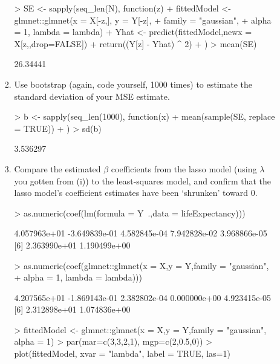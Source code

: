 \documentclass[12pt,a4paper]{paper}
\begin{document}
\begin{enumerate}
\begin{enumerate}
\begin{enumerate}
\begin{Schunk}
\begin{Sinput}
> SE <- sapply(seq_len(N), function(z){
+   fittedModel <- glmnet::glmnet(x = X[-z,], y = Y[-z], 
+                                 family = "gaussian", 
+                                 alpha = 1, lambda = lambda)
+   Yhat <- predict(fittedModel,newx = X[z,,drop=FALSE])
+   return((Y[z] - Yhat) ^ 2)
+ })
> mean(SE)
\end{Sinput}
\begin{Soutput}
[1] 26.34441
\end{Soutput}
\end{Schunk}
\item Use bootstrap (again, code yourself, 1000 times) to estimate the standard deviation of your MSE estimate.
\begin{Schunk}
\begin{Sinput}
> b <- sapply(seq_len(1000), function(x){
+   mean(sample(SE, replace = TRUE))
+ })
> sd(b)
\end{Sinput}
\begin{Soutput}
[1] 3.536297
\end{Soutput}
\end{Schunk}
\item Compare the estimated $\beta$ coefficients from the lasso model (using $\lambda$ you gotten from (i)) to the least-squares model, and confirm that the lasso model’s coefficient estimates have been `shrunken' toward 0.
\begin{Schunk}
\begin{Sinput}
> as.numeric(coef(lm(formula = Y~.,data = lifeExpectancy)))
\end{Sinput}
\begin{Soutput}
[1]  4.057963e+01 -3.649839e-01  4.582845e-04  7.942828e-02  3.968866e-05
[6]  2.363990e+01  1.190499e+00
\end{Soutput}
\begin{Sinput}
> as.numeric(coef(glmnet::glmnet(x = X,y = Y,family = "gaussian",
+                                alpha = 1, lambda = lambda)))
\end{Sinput}
\begin{Soutput}
[1]  4.207565e+01 -1.869143e-01  2.382802e-04  0.000000e+00  4.923415e-05
[6]  2.312898e+01  1.074836e+00
\end{Soutput}
\begin{Sinput}
> fittedModel <- glmnet::glmnet(x = X,y = Y,family = "gaussian", alpha = 1)
> par(mar=c(3,3,2,1), mgp=c(2,0.5,0))
> plot(fittedModel, xvar = "lambda", label = TRUE, las=1)
\end{Sinput}
\end{Schunk}

\end{enumerate}
\end{enumerate}
\end{enumerate}
\end{document}
